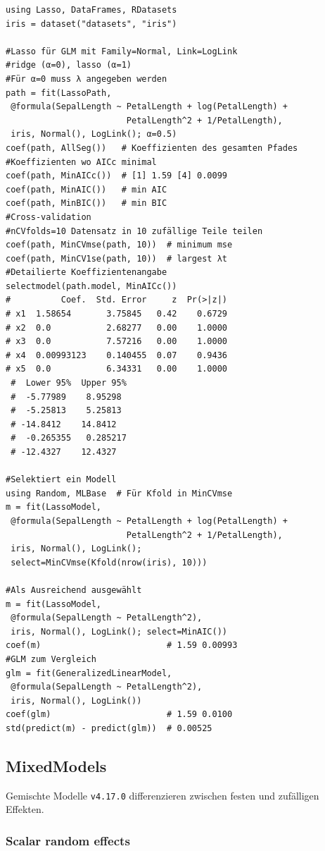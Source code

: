 \documentclass[10pt,twocolumn]{scrartcl}
\begin{document}
\begin{lstlisting}
using Lasso, DataFrames, RDatasets
iris = dataset("datasets", "iris")

#Lasso für GLM mit Family=Normal, Link=LogLink
#ridge (α=0), lasso (α=1)
#Für α=0 muss λ angegeben werden
path = fit(LassoPath,
 @formula(SepalLength ~ PetalLength + log(PetalLength) +
                        PetalLength^2 + 1/PetalLength),
 iris, Normal(), LogLink(); α=0.5)
coef(path, AllSeg())   # Koeffizienten des gesamten Pfades
#Koeffizienten wo AICc minimal
coef(path, MinAICc())  # [1] 1.59 [4] 0.0099
coef(path, MinAIC())   # min AIC
coef(path, MinBIC())   # min BIC
#Cross-validation
#nCVfolds=10 Datensatz in 10 zufällige Teile teilen
coef(path, MinCVmse(path, 10))  # minimum mse
coef(path, MinCV1se(path, 10))  # largest λt
#Detailierte Koeffizientenangabe
selectmodel(path.model, MinAICc())
#          Coef.  Std. Error     z  Pr(>|z|)
# x1  1.58654       3.75845   0.42    0.6729
# x2  0.0           2.68277   0.00    1.0000
# x3  0.0           7.57216   0.00    1.0000
# x4  0.00993123    0.140455  0.07    0.9436
# x5  0.0           6.34331   0.00    1.0000
 #  Lower 95%  Upper 95%
 #  -5.77989    8.95298
 #  -5.25813    5.25813
 # -14.8412    14.8412
 #  -0.265355   0.285217
 # -12.4327    12.4327

#Selektiert ein Modell
using Random, MLBase  # Für Kfold in MinCVmse
m = fit(LassoModel,
 @formula(SepalLength ~ PetalLength + log(PetalLength) +
                        PetalLength^2 + 1/PetalLength),
 iris, Normal(), LogLink();
 select=MinCVmse(Kfold(nrow(iris), 10)))

#Als Ausreichend ausgewählt
m = fit(LassoModel,
 @formula(SepalLength ~ PetalLength^2),
 iris, Normal(), LogLink(); select=MinAIC())
coef(m)                         # 1.59 0.00993
#GLM zum Vergleich
glm = fit(GeneralizedLinearModel,
 @formula(SepalLength ~ PetalLength^2),
 iris, Normal(), LogLink())
coef(glm)                       # 1.59 0.0100
std(predict(m) - predict(glm))  # 0.00525
\end{lstlisting}

\subsection{MixedModels}

Gemischte Modelle \lstinline|v4.17.0| differenzieren zwischen festen und
zufälligen Effekten.

\subsubsection{Scalar random effects}
\end{document}
